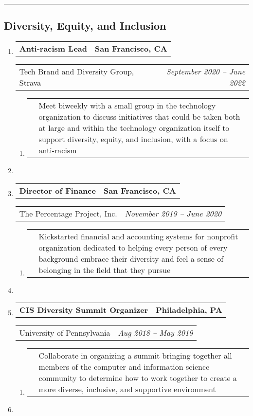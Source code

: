 \documentclass[letterpaper]{article}
\makeatletter
\newcommand*{\tabulardef}[3]{\begin{tabular}[t]{@{}lp{\dimexpr\linewidth-#1}@{}}
    #2&#3
\end{tabular}}
\newcommand{\headerrow}[2]
{\begin{tabular*}{\linewidth}{l@{\extracolsep{\fill}}r}
	#1 &
	#2 \\
\end{tabular*}}
\makeatother
\begin{document}
\hrule

\subsection*{Diversity, Equity, and Inclusion}
\begin{enumerate}[label=]
	\parskip=-0.25em
	\item
		\headerrow
			{\textbf{Anti-racism Lead}}
			{\textbf{San Francisco, CA}}
	\headerrow
		{Tech Brand and Diversity Group, Strava}
		{\emph{September 2020 -- June 2022}}
	\begin{enumerate}[label= *]
	\parskip=-0.1em
		\item\tabulardef{5cm}{}{Meet biweekly with a small group in the technology organization to discuss initiatives that could be taken both at large and within the technology organization itself to support diversity, equity, and inclusion, with a focus on anti-racism}
	\end{enumerate}

    \item
 
	\item
		\headerrow
			{\textbf{Director of Finance}}
			{\textbf{San Francisco, CA}}
	\headerrow
		{The Percentage Project, Inc.}
		{\emph{November 2019 -- June 2020}}
	\begin{enumerate}[label= *]
	\parskip=-0.1em
		\item\tabulardef{5cm}{}{Kickstarted financial and accounting systems for nonprofit organization dedicated to helping every person of every background embrace their diversity and feel a sense of belonging in the field that they pursue}
	\end{enumerate}

    \item

	\item
		\headerrow
			{\textbf{CIS Diversity Summit Organizer}}
			{\textbf{Philadelphia, PA}}
	\headerrow
		{University of Pennsylvania}
		{\emph{Aug 2018 -- May 2019}}
	\begin{enumerate}[label= *]
	\parskip=-0.1em
		\item\tabulardef{5cm}{}{Collaborate in organizing a summit bringing together all members of the computer and information science community to determine how to work together to create a more diverse, inclusive, and supportive environment}
	\end{enumerate}

    \item


\end{enumerate}
\end{document}
